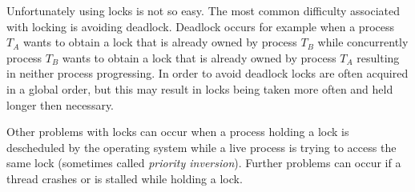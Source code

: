 \documentclass[runningheads,a4paper]{article}
\begin{document}
% 
% 

Unfortunately using locks is not so easy.
The most common difficulty associated with locking
is avoiding deadlock.
Deadlock occurs for example when a process $T_A$ wants to obtain a lock that
is already owned by process $T_B$ while concurrently process $T_B$ wants
to obtain a lock that is already owned by process $T_A$ resulting
in neither process progressing.
In order to avoid deadlock locks are often acquired in a global order,
but this may result in locks being taken more often and held longer then necessary.

Other problems with locks can occur when a process holding a lock
is descheduled by the operating system while a live process is trying to
access the same lock (sometimes called \emph{priority inversion}).
Further problems can occur if a thread crashes or is stalled while
holding a lock.

\end{document}
